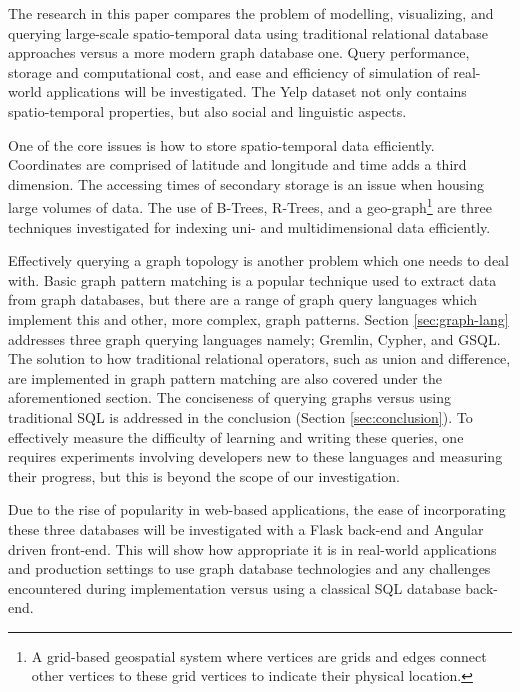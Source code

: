 The research in this paper compares the problem of modelling, visualizing, and querying large-scale spatio-temporal data using traditional relational database approaches versus a more modern graph database one. 
Query performance, storage and computational cost, and ease and efficiency of simulation of real-world applications will be investigated. The Yelp dataset not only contains spatio-temporal properties, but also social and linguistic aspects.

One of the core issues is how to store spatio-temporal data efficiently. Coordinates are comprised of latitude and longitude and time adds a third dimension. The accessing times of secondary storage is an issue when housing large volumes of data. The use of B-Trees, R-Trees, and a geo-graph\footnote{A grid-based geospatial system where vertices are grids and edges connect other vertices to these grid vertices to indicate their physical location.} are three techniques investigated for indexing uni- and multidimensional data efficiently.

Effectively querying a graph topology is another problem which one needs to deal with. Basic graph pattern matching is a popular technique used to extract data from graph databases, but there are a range of graph query languages which implement this and other, more complex, graph patterns. Section \ref{sec:graph-lang} addresses three graph querying languages namely; Gremlin, Cypher, and GSQL. The solution to how traditional relational operators, such as union and difference, are implemented in graph pattern matching are also covered under the aforementioned section. The conciseness of querying graphs versus using traditional SQL is addressed in the conclusion (Section \ref{sec:conclusion}). To effectively measure the difficulty of learning and writing these queries, one requires experiments involving developers new to these languages and measuring their progress, but this is beyond the scope of our investigation.



Due to the rise of popularity in web-based applications, the ease of incorporating these three databases will be investigated with a Flask \cite{flask} back-end and Angular \cite{angular} driven front-end. This will show how appropriate it is in real-world applications and production settings to use graph database technologies and any challenges encountered during implementation versus using a classical SQL database back-end.
